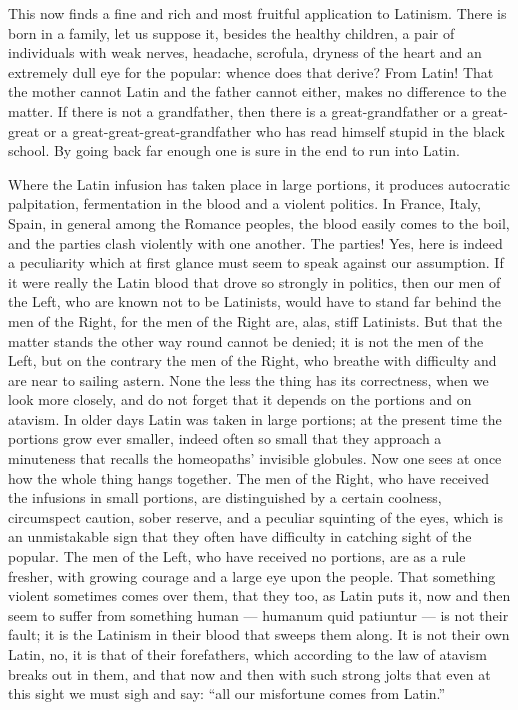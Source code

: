 \documentclass[12pt,a4paper,openany]{book}
\newcommand{\opage}[1]{\marginnote{\footnotesize\textit{[#1]}}}
\begin{document}
\setcounter{footnote}{0}%
\opage{125}This now finds a fine and rich and most fruitful
application to Latinism. There is born in a family, let
us suppose it, besides the healthy children, a pair of individuals
with weak nerves, headache, scrofula, dryness of
the heart and an extremely dull eye for the popular: whence
does that derive? From Latin! That the mother cannot
Latin and the father cannot either, makes no difference to the matter.
If there is not a grandfather, then there is a great-grandfather
or a great-great or a great-great-great-grandfather who has read
himself stupid in the black school. By going back far
enough one is sure in the end to run into Latin.

Where the Latin infusion has taken place in large
portions, it produces autocratic palpitation, fermentation
in the blood and a violent politics. In France, Italy,
Spain, in general among the Romance peoples,
the blood easily comes to the boil, and the parties clash violently
with one another. The parties! Yes, here is indeed a
peculiarity which at first glance must seem to
speak against our assumption. If it were really the
Latin blood that drove so strongly in politics, then
our men of the Left, who are known not to be Latinists,
would have to stand far behind the men of the Right, for the men of the Right
are, alas, stiff Latinists. But that the matter stands
the other way round cannot be denied; it is not the men of the Left,
but on the contrary the men of the Right, who breathe
with difficulty and are near to sailing astern. None the
less the thing has its correctness, when we look more closely,
and do not forget that it depends on the portions
and on atavism. In older days Latin was taken
in large portions; at the present time the
portions grow ever smaller, indeed often so small that they
approach a minuteness that recalls the
\setcounter{footnote}{0}%
\opage{126}homeopaths' invisible globules. Now one sees at once how
the whole thing hangs together. The men of the Right, who
have received the infusions in small portions, are distinguished
by a certain coolness, circumspect caution, sober
reserve, and a peculiar squinting of the eyes, which is an
unmistakable sign that they often have difficulty
in catching sight of the popular. The men of the Left, who
have received no portions, are as a rule fresher, with
growing courage and a large eye upon the people. That
something violent sometimes comes over them, that they too,
as Latin puts it, now and then seem to suffer from
something human --- humanum quid patiuntur --- is
not their fault; it is the Latinism in their blood that
sweeps them along. It is not their own Latin, no, it
is that of their forefathers, which according to the law of atavism breaks
out in them, and that now and then with such strong
jolts that even at this sight we must sigh and say:
``all our misfortune comes from Latin.''
\end{document}
